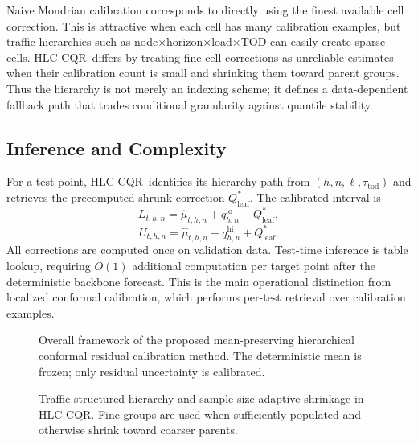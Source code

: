\documentclass[letterpaper,journal]{IEEEtran}
\newcommand{\hlc}{HLC-CQR}
\begin{document}
Naive Mondrian calibration corresponds to directly using the finest available cell correction. This is attractive when each cell has many calibration examples, but traffic hierarchies such as node$\times$horizon$\times$load$\times$TOD can easily create sparse cells. \hlc\ differs by treating fine-cell corrections as unreliable estimates when their calibration count is small and shrinking them toward parent groups. Thus the hierarchy is not merely an indexing scheme; it defines a data-dependent fallback path that trades conditional granularity against quantile stability.

\subsection{Inference and Complexity}
For a test point, \hlc\ identifies its hierarchy path from $(h,n,\ell,\tau_{\mathrm{tod}})$ and retrieves the precomputed shrunk correction $Q^*_{\mathrm{leaf}}$. The calibrated interval is
\begin{equation}
    L_{t,h,n}=\hat{\mu}_{t,h,n}+q^{\mathrm{lo}}_{h,n}-Q^*_{\mathrm{leaf}},
\end{equation}
\begin{equation}
    U_{t,h,n}=\hat{\mu}_{t,h,n}+q^{\mathrm{hi}}_{h,n}+Q^*_{\mathrm{leaf}}.
\end{equation}
All corrections are computed once on validation data. Test-time inference is table lookup, requiring $O(1)$ additional computation per target point after the deterministic backbone forecast. This is the main operational distinction from localized conformal calibration, which performs per-test retrieval over calibration examples.

\begin{figure}[t]
\centering
{}
\caption{Overall framework of the proposed mean-preserving hierarchical conformal residual calibration method. The deterministic mean is frozen; only residual uncertainty is calibrated.}
\label{fig:framework}
\end{figure}

\begin{figure}[t]
\centering
{}
\caption{Traffic-structured hierarchy and sample-size-adaptive shrinkage in \hlc. Fine groups are used when sufficiently populated and otherwise shrink toward coarser parents.}
\label{fig:hierarchy}
\end{figure}
\end{document}
